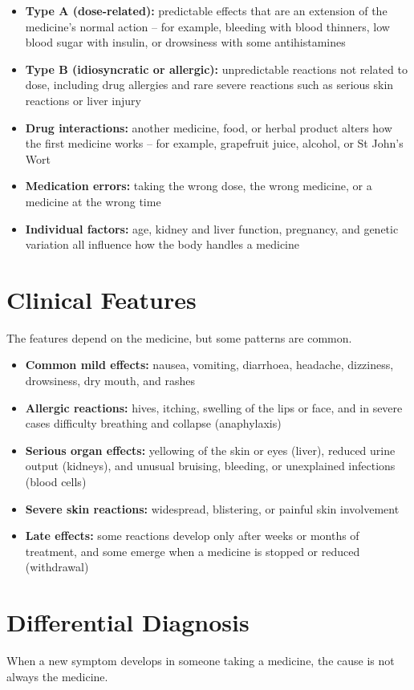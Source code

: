 \begin{itemize}
    \item \textbf{Type A (dose-related):} predictable effects that are an extension of the medicine's normal action -- for example, bleeding with blood thinners, low blood sugar with insulin, or drowsiness with some antihistamines
    \item \textbf{Type B (idiosyncratic or allergic):} unpredictable reactions not related to dose, including drug allergies and rare severe reactions such as serious skin reactions or liver injury
    \item \textbf{Drug interactions:} another medicine, food, or herbal product alters how the first medicine works -- for example, grapefruit juice, alcohol, or St John's Wort
    \item \textbf{Medication errors:} taking the wrong dose, the wrong medicine, or a medicine at the wrong time
    \item \textbf{Individual factors:} age, kidney and liver function, pregnancy, and genetic variation all influence how the body handles a medicine
\end{itemize}

\section*{Clinical Features}
The features depend on the medicine, but some patterns are common.

\begin{itemize}
    \item \textbf{Common mild effects:} nausea, vomiting, diarrhoea, headache, dizziness, drowsiness, dry mouth, and rashes
    \item \textbf{Allergic reactions:} hives, itching, swelling of the lips or face, and in severe cases difficulty breathing and collapse (anaphylaxis)
    \item \textbf{Serious organ effects:} yellowing of the skin or eyes (liver), reduced urine output (kidneys), and unusual bruising, bleeding, or unexplained infections (blood cells)
    \item \textbf{Severe skin reactions:} widespread, blistering, or painful skin involvement
    \item \textbf{Late effects:} some reactions develop only after weeks or months of treatment, and some emerge when a medicine is stopped or reduced (withdrawal)
\end{itemize}

\section*{Differential Diagnosis}
When a new symptom develops in someone taking a medicine, the cause is not always the medicine.

